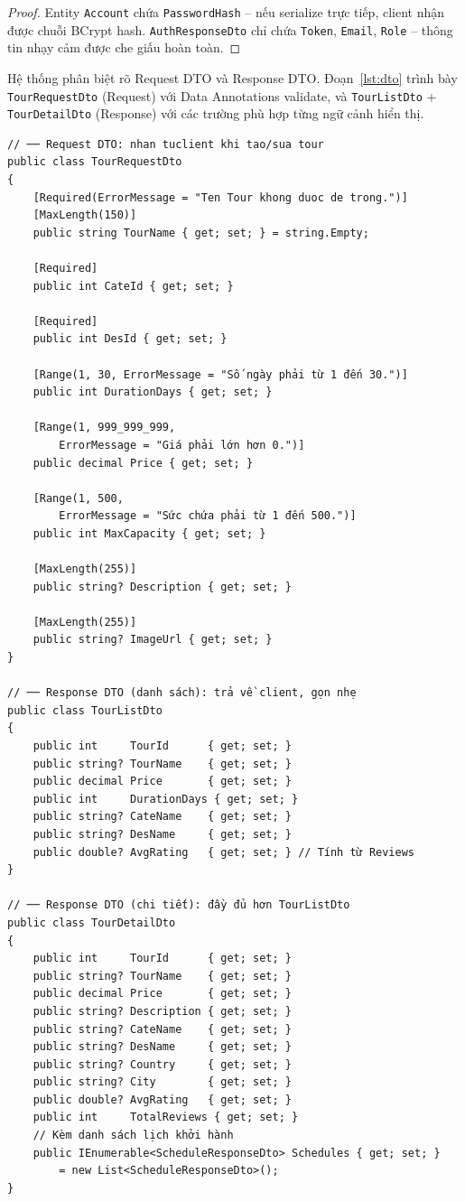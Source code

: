 \noindent\begin{proof}
Entity \texttt{Account} chứa \texttt{PasswordHash} -- nếu
serialize trực tiếp, client nhận được chuỗi BCrypt hash.
\texttt{AuthResponseDto} chỉ chứa \texttt{Token}, \texttt{Email},
\texttt{Role} -- thông tin nhạy cảm được che giấu hoàn toàn.
\QEDAa
\end{proof}

Hệ thống phân biệt rõ Request DTO và Response DTO. Đoạn~\ref{lst:dto}
trình bày \texttt{TourRequestDto} (Request) với Data Annotations
validate, và \texttt{TourListDto} + \texttt{TourDetailDto}
(Response) với các trường phù hợp từng ngữ cảnh hiển thị.

\begin{lstlisting}[style=csharp,
  caption={Request DTO và Response DTO cho Tour},
  label={lst:dto}]
// ── Request DTO: nhan tuclient khi tao/sua tour
public class TourRequestDto
{
    [Required(ErrorMessage = "Ten Tour khong duoc de trong.")]
    [MaxLength(150)]
    public string TourName { get; set; } = string.Empty;

    [Required]
    public int CateId { get; set; }

    [Required]
    public int DesId { get; set; }

    [Range(1, 30, ErrorMessage = "Số ngày phải từ 1 đến 30.")]
    public int DurationDays { get; set; }

    [Range(1, 999_999_999,
        ErrorMessage = "Giá phải lớn hơn 0.")]
    public decimal Price { get; set; }

    [Range(1, 500,
        ErrorMessage = "Sức chứa phải từ 1 đến 500.")]
    public int MaxCapacity { get; set; }

    [MaxLength(255)]
    public string? Description { get; set; }

    [MaxLength(255)]
    public string? ImageUrl { get; set; }
}

// ── Response DTO (danh sách): trả về client, gọn nhẹ
public class TourListDto
{
    public int     TourId      { get; set; }
    public string? TourName    { get; set; }
    public decimal Price       { get; set; }
    public int     DurationDays { get; set; }
    public string? CateName    { get; set; }
    public string? DesName     { get; set; }
    public double? AvgRating   { get; set; } // Tính từ Reviews
}

// ── Response DTO (chi tiết): đầy đủ hơn TourListDto
public class TourDetailDto
{
    public int     TourId      { get; set; }
    public string? TourName    { get; set; }
    public decimal Price       { get; set; }
    public string? Description { get; set; }
    public string? CateName    { get; set; }
    public string? DesName     { get; set; }
    public string? Country     { get; set; }
    public string? City        { get; set; }
    public double? AvgRating   { get; set; }
    public int     TotalReviews { get; set; }
    // Kèm danh sách lịch khởi hành
    public IEnumerable<ScheduleResponseDto> Schedules { get; set; }
        = new List<ScheduleResponseDto>();
}
\end{lstlisting}

